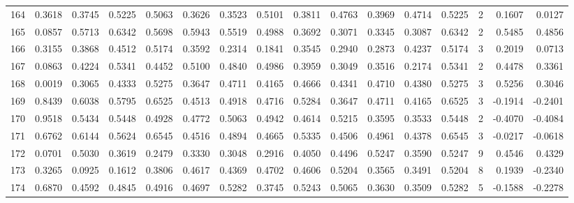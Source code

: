 \begin{tabular}{lrrrrrrrrrrrrrrr}
164 &      0.3618 &  0.3745 &  0.5225 &  0.5063 &  0.3626 &  0.3523 &  0.5101 &  0.3811 &  0.4763 &  0.3969 &   0.4714 &     0.5225 &      2 &                    0.1607 &                     0.0127 \\
165 &      0.0857 &  0.5713 &  0.6342 &  0.5698 &  0.5943 &  0.5519 &  0.4988 &  0.3692 &  0.3071 &  0.3345 &   0.3087 &     0.6342 &      2 &                    0.5485 &                     0.4856 \\
166 &      0.3155 &  0.3868 &  0.4512 &  0.5174 &  0.3592 &  0.2314 &  0.1841 &  0.3545 &  0.2940 &  0.2873 &   0.4237 &     0.5174 &      3 &                    0.2019 &                     0.0713 \\
167 &      0.0863 &  0.4224 &  0.5341 &  0.4452 &  0.5100 &  0.4840 &  0.4986 &  0.3959 &  0.3049 &  0.3516 &   0.2174 &     0.5341 &      2 &                    0.4478 &                     0.3361 \\
168 &      0.0019 &  0.3065 &  0.4333 &  0.5275 &  0.3647 &  0.4711 &  0.4165 &  0.4666 &  0.4341 &  0.4710 &   0.4380 &     0.5275 &      3 &                    0.5256 &                     0.3046 \\
169 &      0.8439 &  0.6038 &  0.5795 &  0.6525 &  0.4513 &  0.4918 &  0.4716 &  0.5284 &  0.3647 &  0.4711 &   0.4165 &     0.6525 &      3 &                   -0.1914 &                    -0.2401 \\
170 &      0.9518 &  0.5434 &  0.5448 &  0.4928 &  0.4772 &  0.5063 &  0.4942 &  0.4614 &  0.5215 &  0.3595 &   0.3533 &     0.5448 &      2 &                   -0.4070 &                    -0.4084 \\
171 &      0.6762 &  0.6144 &  0.5624 &  0.6545 &  0.4516 &  0.4894 &  0.4665 &  0.5335 &  0.4506 &  0.4961 &   0.4378 &     0.6545 &      3 &                   -0.0217 &                    -0.0618 \\
172 &      0.0701 &  0.5030 &  0.3619 &  0.2479 &  0.3330 &  0.3048 &  0.2916 &  0.4050 &  0.4496 &  0.5247 &   0.3590 &     0.5247 &      9 &                    0.4546 &                     0.4329 \\
173 &      0.3265 &  0.0925 &  0.1612 &  0.3806 &  0.4617 &  0.4369 &  0.4702 &  0.4606 &  0.5204 &  0.3565 &   0.3491 &     0.5204 &      8 &                    0.1939 &                    -0.2340 \\
174 &      0.6870 &  0.4592 &  0.4845 &  0.4916 &  0.4697 &  0.5282 &  0.3745 &  0.5243 &  0.5065 &  0.3630 &   0.3509 &     0.5282 &      5 &                   -0.1588 &                    -0.2278 \\

\end{tabular}
